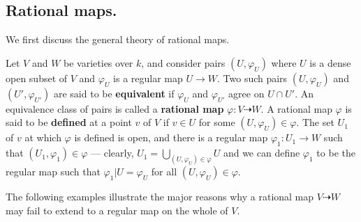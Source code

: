 


\subsection*{Rational maps.}

We first discuss the general theory of rational maps.

Let $V$ and $W$ be varieties over $k$, and consider pairs $(U, \varphi_U)$
where $U$ is a dense open subset of $V$ and $\varphi_U$ is a regular map
$U \to W$. Two such pairs $(U, \varphi_U)$ and $(U', \varphi_{U'})$ are said
to be \textbf{equivalent} if $\varphi_U$ and $\varphi_{U'}$ agree on
$U \cap U'$. An equivalence class of pairs is called a \textbf{rational map}
$\varphi \colon V \dashrightarrow W$. A rational map $\varphi$ is said to be
\textbf{defined} at a point $v$ of $V$ if $v \in U$ for some
$(U, \varphi_U) \in \varphi$. The set $U_1$ of $v$ at which $\varphi$ is
defined is open, and there is a regular map $\varphi_1 \colon U_1 \to W$ such
that $(U_1, \varphi_1) \in \varphi$ --- clearly,
$U_1 = \bigcup_{(U, \varphi_U) \in \varphi} U$ and we can define $\varphi_1$
to be the regular map such that $\varphi_1 | U = \varphi_U$ for all
$(U, \varphi_U) \in \varphi$.

The following examples illustrate the major reasons why a rational map
$V \dashrightarrow W$ may fail to extend to a regular map on the whole of
$V$.


